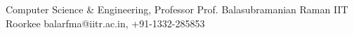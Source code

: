 

\begin{cventries}
     \cventry
    {Computer Science \& Engineering, Professor} %
    {Prof. Balasubramanian Raman} %
    {IIT Roorkee} %
    {}
    {balarfma@iitr.ac.in, +91-1332-285853}    

\end{cventries}